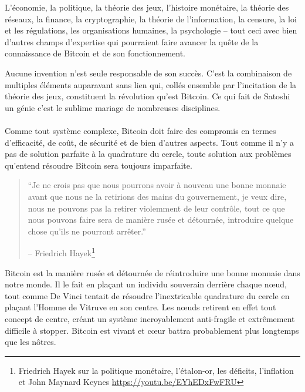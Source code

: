L'économie, la politique, la théorie des jeux, l'histoire monétaire, la théorie
des réseaux, la finance, la cryptographie, la théorie de l'information, la
censure, la loi et les régulations, les organisations humaines, la psychologie
-- tout ceci avec bien d'autres champs d'expertise qui pourraient faire avancer
la quête de la connaissance de Bitcoin et de son fonctionnement.

Aucune invention n'est seule responsable de son succès. C'est la combinaison
de multiples éléments auparavant sans lien qui, collés ensemble par l'incitation
de la théorie des jeux, constituent la révolution qu'est Bitcoin. Ce qui fait de
Satoshi un génie c'est le sublime mariage de nombreuses disciplines. 

\paragraph{} Comme tout système complexe, Bitcoin doit faire des compromis en
termes d'efficacité, de coût, de sécurité et de bien d'autres aspects. Tout
comme il n'y a pas de solution parfaite à la quadrature du cercle, toute
solution aux problèmes qu'entend résoudre Bitcoin sera toujours imparfaite.

\begin{quotation}\begin{samepage}
\enquote{Je ne crois pas que nous pourrons avoir à nouveau une bonne monnaie
avant que nous ne la retirions des mains du gouvernement, je veux dire, nous ne
pouvons pas la retirer violemment de leur contrôle, tout ce que nous pouvons
faire sera de manière rusée et détournée, introduire quelque chose qu'ils ne
pourront arrêter.}
\begin{flushright} -- Friedrich Hayek\footnote{Friedrich Hayek sur la politique
monétaire, l'étalon-or, les déficits, l'inflation et John Maynard Keynes
\url{https://youtu.be/EYhEDxFwFRU}}
\end{flushright}\end{samepage}\end{quotation}

Bitcoin est la manière rusée et détournée de réintroduire une bonne monnaie dans
notre monde. Il le fait en plaçant un individu souverain derrière chaque nœud,
tout comme De Vinci tentait de résoudre l'inextricable quadrature du cercle en
plaçant l'Homme de Vitruve en son centre. Les nœuds retirent en effet tout
concept de centre, créant un système incroyablement anti-fragile et extrêmement
difficile à stopper. Bitcoin est vivant et cœur battra probablement plus
longtemps que les nôtres.

